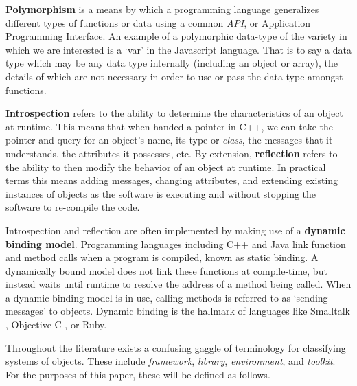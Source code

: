 \documentclass[twoside,10pt]{article}
\begin{document}
\textbf{Polymorphism} is a means by which a programming language generalizes different types of functions or data using a common \emph{API}, or Application Programming Interface.  An example of a polymorphic data-type of the variety in which we are interested is a `var' in the Javascript language\cite{Flanagan:2002}.  That is to say a data type which may be any data type internally (including an object or array), the details of which are not necessary in order to use or pass the data type amongst functions.

\textbf{Introspection} refers to the ability to determine the characteristics of an object at runtime.  This means that when handed a pointer in C++, we can take the pointer and query for an object's name, its type or \emph{class}, the messages that it understands, the attributes it possesses, etc.  By extension, \textbf{reflection} refers to the ability to then modify the behavior of an object at runtime\cite{Malenfant:1996}.  In practical terms this means adding messages, changing attributes, and extending existing instances of objects as the software is executing and without stopping the software to re-compile the code.

Introspection and reflection are often implemented by making use of a \textbf{dynamic binding model}.  Programming languages including C++ and Java link function and method calls when a program is compiled, known as static binding.  A dynamically bound model does not link these functions at compile-time, but instead waits until runtime to resolve the address of a method being called.  When a dynamic binding model is in use, calling methods is referred to as `sending messages' to objects. Dynamic binding is the hallmark of languages like Smalltalk \cite{Krasner:1988}, Objective-C \cite{Cox:1986}, or Ruby.

Throughout the literature exists a confusing gaggle of terminology for classifying systems of objects.  These include \emph{framework}, \emph{library}, \emph{environment}, and \emph{toolkit}.  For the purposes of this paper, these will be defined as follows. 

\end{document}

